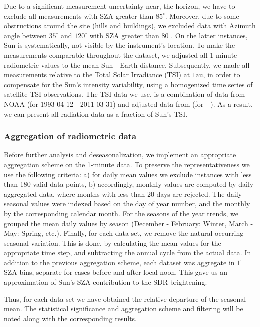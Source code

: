 \documentclass[preprint, 3p,
authoryear]{elsarticle} %
\begin{document}
Due to a significant measurement uncertainty near, the horizon, we have
to exclude all measurements with SZA greater than \(85^\circ\).
Moreover, due to some obstructions around the site (hills and
buildings), we excluded data with Azimuth angle between \(35^\circ\) and
\(120^\circ\) with SZA greater than \(80^\circ\). On the latter
instances, Sun is systematically, not visible by the instrument's
location. To make the measurements comparable throughout the dataset, we
adjusted all 1-minute radiometric values to the mean Sun - Earth
distance. Subsequently, we made all measurements relative to the Total
Solar Irradiance (TSI) at \(1 \text{au}\), in order to compensate for
the Sun's intensity variability, using a homogenized time series of
satellite TSI observations. The TSI data we use, is a combination of
data from NOAA \citep{Coddington2005} (for 1993-04-12 - 2011-03-31) and
adjusted data from \citet{TSIStsi} (for - ). As a result, we can present
all radiation data as a fraction of Sun's TSI.

\hypertarget{aggregation-of-radiometric-data}{%
\subsubsection{Aggregation of radiometric
data}\label{aggregation-of-radiometric-data}}

Before further analysis and deseasonalization, we implement an
appropriate aggregation scheme on the 1-minute data. To preserve the
representativeness we use the following criteria: a) for daily mean
values we exclude instances with less than 180 valid data points, b)
accordingly, monthly values are computed by daily aggregated data, where
months with less than 20 days are rejected. The daily seasonal values
were indexed based on the day of year number, and the monthly by the
corresponding calendar month. For the seasons of the year trends, we
grouped the mean daily values by season (December - February: Winter,
March - May: Spring, etc.). Finally, for each data set, we remove the
natural occurring seasonal variation. This is done, by calculating the
mean values for the appropriate time step, and subtracting the annual
cycle from the actual data. In addition to the previous aggregation
scheme, each dataset was aggregate in \(1^\circ\) SZA bins, separate for
cases before and after local noon. This gave us an approximation of
Sun's SZA contribution to the SDR brightening.

Thus, for each data set we have obtained the relative departure of the
seasonal mean. The statistical significance and aggregation scheme and
filtering will be noted along with the corresponding results.
\end{document}
